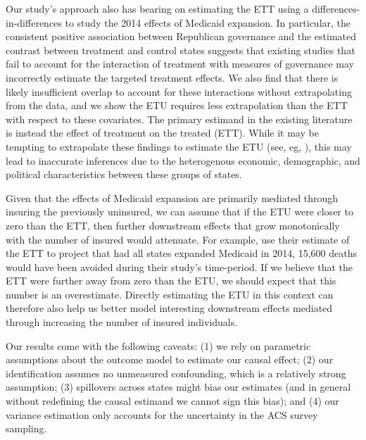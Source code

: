 \documentclass[12pt]{article}
\begin{document}
Our study's approach also has bearing on estimating the ETT using a differences-in-differences to study the 2014 effects of Medicaid expansion. In particular, the consistent positive association between Republican governance and the estimated contrast between treatment and control states suggests that existing studies that fail to account for the interaction of treatment with measures of governance may incorrectly estimate the targeted treatment effects. We also find that there is likely insufficient overlap to account for these interactions without extrapolating from the data, and we show the ETU requires less extrapolation than the ETT with respect to these covariates. The primary estimand in the existing literature is instead the effect of treatment on the treated (ETT). While it may be tempting to extrapolate these findings to estimate the ETU (see, eg, \cite{miller2019medicaid}), this may lead to inaccurate inferences due to the heterogenous economic, demographic, and political characteristics between these groups of states.

Given that the effects of Medicaid expansion are primarily mediated through insuring the previously uninsured, we can assume that if the ETU were closer to zero than the ETT, then further downstream effects that grow monotonically with the number of insured would attenuate. For example, \cite{miller2019medicaid} use their estimate of the ETT to project that had all states expanded Medicaid in 2014, 15,600 deaths would have been avoided during their study's time-period. If we believe that the ETT were further away from zero than the ETU, we should expect that this number is an overestimate. Directly estimating the ETU in this context can therefore also help us better model interesting downstream effects mediated through increasing the number of insured individuals.

Our results come with the following caveats: (1) we rely on parametric assumptions about the outcome model to estimate our causal effect; (2) our identification assumes no unmeasured confounding, which is a relatively strong assumption; (3) spillovers across states might bias our estimates (and in general without redefining the causal estimand we cannot sign this bias); and (4) our variance estimation only accounts for the uncertainty in the ACS survey sampling. 
\end{document}
